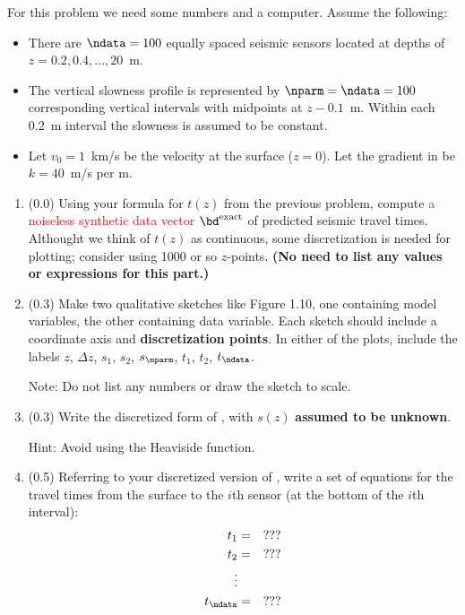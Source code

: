 \documentclass[11pt,titlepage,fleqn]{article}
\begin{document}
For this problem we need some numbers and a computer. Assume the following:
%
\begin{itemize}
\item There are $\ndata=100$ equally spaced seismic sensors located at depths of $z = 0.2, 0.4, \ldots, 20$~m.
\item The vertical slowness profile is represented by $\nparm=\ndata=100$ corresponding vertical intervals with midpoints at $z - 0.1$~m. Within each 0.2~m interval the slowness is assumed to be constant.
\item Let $v_0 = 1$~km/s be the velocity at the surface ($z=0$). Let the gradient in  be $k = 40$~m/s per m.
\end{itemize}

\begin{enumerate}

\item (0.0) Using your formula for $t(z)$ from the previous problem, compute \textcolor{red}{a noiseless synthetic data vector $\bd^{\rm exact}$} of predicted seismic travel times. Althought we think of $t(z)$ as continuous, some discretization is needed for plotting; consider using 1000 or so $z$-points. 
{\bf (No need to list any values or expressions for this part.)}

\item (0.3)  Make two qualitative sketches like Figure 1.10, one containing model variables, the other containing data variable. Each sketch should include a coordinate axis and {\bf discretization points}. In either of the plots, include the labels $z$, $\Delta z$, $s_1$, $s_2$, $s_\nparm$, $t_1$, $t_2$, $t_\ndata$.

Note: Do not list any numbers or draw the sketch to scale.


\item (0.3) Write the discretized form of , with $s(z)$ {\bf assumed to be unknown}.

Hint: Avoid using the Heaviside function.


\item (0.5) Referring to your discretized version of , write a set of equations for the travel times from the surface to the $i$th sensor (at the bottom of the $i$th interval):
%
\begin{eqnarray*}
t_1 &=& ???
\\
t_2 &=& ???
\\
\vdots
\\
t_\ndata &=& ???
\end{eqnarray*}


\end{enumerate}
\end{document}
